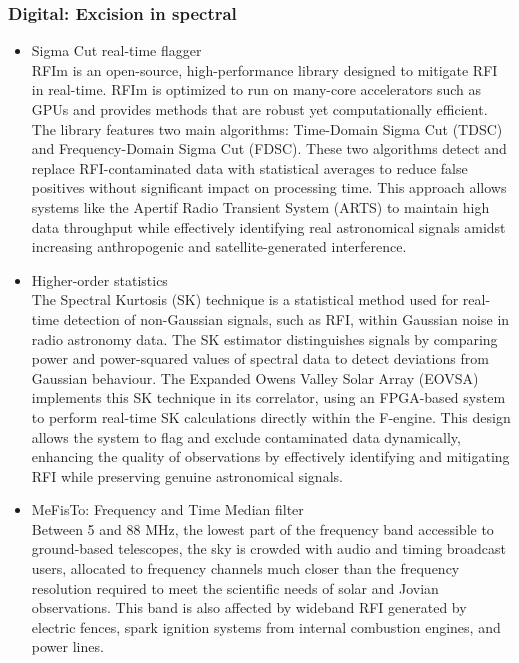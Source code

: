 \subsubsection{Digital: Excision in spectral}
\begin{itemize}
\item Sigma Cut real-time flagger\\

RFIm \citep{sclocco2019real} is an open-source, high-performance library designed to mitigate RFI in real-time. RFIm is optimized to run on many-core accelerators such as GPUs and provides methods that are robust yet computationally efficient. The library features two main algorithms: Time-Domain Sigma Cut (TDSC) and Frequency-Domain Sigma Cut (FDSC). These two algorithms detect and replace RFI-contaminated data with statistical averages to reduce false positives without significant impact on processing time. This approach allows systems like the Apertif Radio Transient System (ARTS) to maintain high data throughput while effectively identifying real astronomical signals amidst increasing anthropogenic and satellite-generated interference.
 
\item Higher-order statistics\\

The Spectral Kurtosis (SK) technique is a statistical method used for real-time detection of non-Gaussian signals, such as RFI, within Gaussian noise in radio astronomy data. The SK estimator distinguishes signals by comparing power and power-squared values of spectral data to detect deviations from Gaussian behaviour. The Expanded Owens Valley Solar Array (EOVSA) implements this SK technique in its correlator, using an FPGA-based system to perform real-time SK calculations directly within the F-engine. This design allows the system to flag and exclude contaminated data dynamically, enhancing the quality of observations by effectively identifying and mitigating RFI while preserving genuine astronomical signals.

\item MeFisTo: Frequency and Time Median filter\\

Between 5 and 88 MHz, the lowest part of the frequency band accessible to ground-based telescopes, the sky is crowded with audio and timing broadcast users, allocated to frequency channels much closer than the frequency resolution required to meet the scientific needs of solar and Jovian observations. This band is also affected by wideband RFI generated by electric fences, spark ignition systems from internal combustion engines, and power lines.


\end{itemize}
